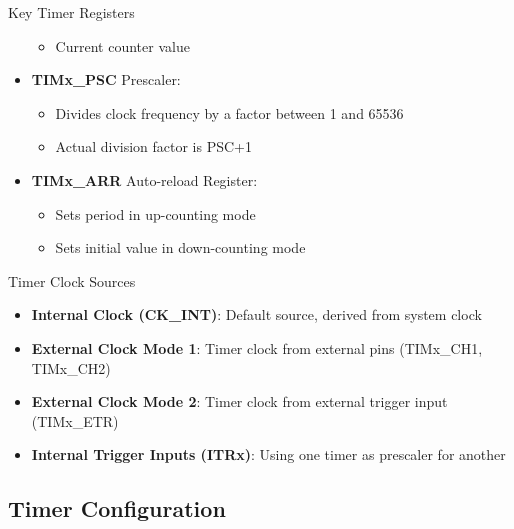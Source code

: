 \begin{theorem}{Key Timer Registers}
\begin{minipage}{0.5\linewidth}
\begin{itemize}
    \begin{itemize}
        \item Current counter value
    \end{itemize}
    \item \textbf{TIMx\_PSC} Prescaler:
    \begin{itemize}
        \item Divides clock frequency by a factor between 1 and 65536
        \item Actual division factor is PSC+1
    \end{itemize}
    \item \textbf{TIMx\_ARR} Auto-reload Register:
    \begin{itemize}
        \item Sets period in up-counting mode
        \item Sets initial value in down-counting mode
    \end{itemize}
\end{itemize}
\end{minipage}
\end{theorem}


\begin{corollary}{Timer Clock Sources}
\begin{itemize}
    \item \textbf{Internal Clock (CK\_INT)}: Default source, derived from system clock
    \item \textbf{External Clock Mode 1}: Timer clock from external pins (TIMx\_CH1, TIMx\_CH2)
    \item \textbf{External Clock Mode 2}: Timer clock from external trigger input (TIMx\_ETR)
    \item \textbf{Internal Trigger Inputs (ITRx)}: Using one timer as prescaler for another
\end{itemize}
\end{corollary}


\subsection{Timer Configuration}


